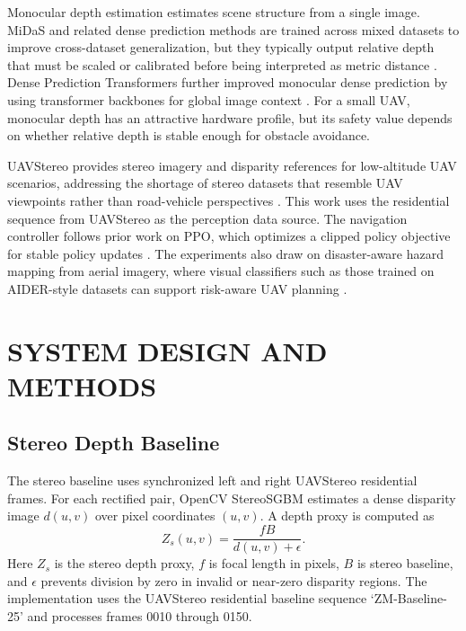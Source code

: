 \documentclass[12pt]{article}
\begin{document}
Monocular depth estimation estimates scene structure from a single image. MiDaS and related dense prediction methods are trained across mixed datasets to improve cross-dataset generalization, but they typically output relative depth that must be scaled or calibrated before being interpreted as metric distance \cite{ranftl2022midas}. Dense Prediction Transformers further improved monocular dense prediction by using transformer backbones for global image context \cite{ranftl2021dpt}. For a small UAV, monocular depth has an attractive hardware profile, but its safety value depends on whether relative depth is stable enough for obstacle avoidance.

UAVStereo provides stereo imagery and disparity references for low-altitude UAV scenarios, addressing the shortage of stereo datasets that resemble UAV viewpoints rather than road-vehicle perspectives \cite{uavstereo2023}. This work uses the residential sequence from UAVStereo as the perception data source. The navigation controller follows prior work on PPO, which optimizes a clipped policy objective for stable policy updates \cite{schulman2017ppo}. The experiments also draw on disaster-aware hazard mapping from aerial imagery, where visual classifiers such as those trained on AIDER-style datasets can support risk-aware UAV planning \cite{aider2020}.

\section{\MakeUppercase{System Design and Methods}}

\subsection{Stereo Depth Baseline}

\noindent
The stereo baseline uses synchronized left and right UAVStereo residential frames. For each rectified pair, OpenCV StereoSGBM estimates a dense disparity image $d(u,v)$ over pixel coordinates $(u,v)$. A depth proxy is computed as
\begin{equation}
Z_s(u,v)=\frac{fB}{d(u,v)+\epsilon}.
\end{equation}
Here $Z_s$ is the stereo depth proxy, $f$ is focal length in pixels, $B$ is stereo baseline, and $\epsilon$ prevents division by zero in invalid or near-zero disparity regions. The implementation uses the UAVStereo residential baseline sequence `ZM-Baseline-25' and processes frames 0010 through 0150.
\end{document}
